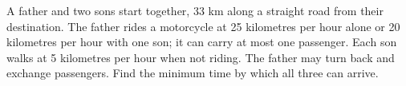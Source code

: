 A father and two sons start together, 33 km along a straight road from their destination. The father rides a motorcycle at 25 kilometres per hour alone or 20 kilometres per hour with one son; it can carry at most one passenger. Each son walks at 5 kilometres per hour when not riding. The father may turn back and exchange passengers. Find the minimum time by which all three can arrive.
